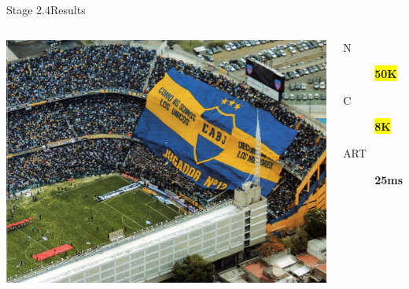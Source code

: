 \documentclass[utf8,hyperref={colorlinks=true}]{beamer}
\begin{document}
\begin{frame}{Stage 2.4}{Results}
	\begin{columns}
			\includegraphics[top=-1,width=\textwidth]{img/results-3-4.jpg}
			\begin{description}
				\item[N] \textbf{\colorbox{yellow}{\Large 50K}}
				\item[C] \textbf{\colorbox{yellow}{\Large 8K}}
				\item[ART] \textbf{\Large 25ms}
			\end{description}
	\end{columns}
\end{frame}
\end{document}
